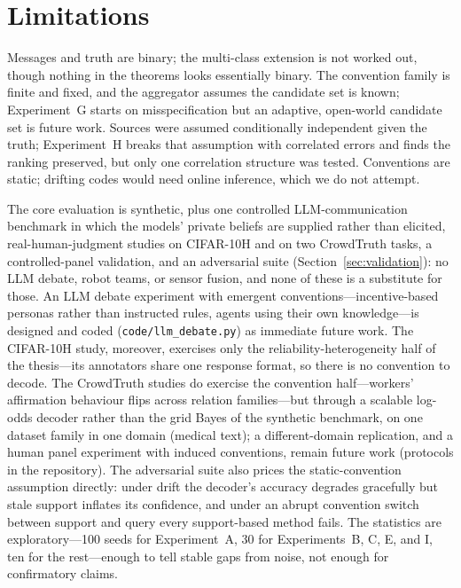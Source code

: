 \section{Limitations}

Messages and truth are binary; the multi-class extension is not worked
out, though nothing in the theorems looks essentially binary. The
convention family is finite and fixed, and the aggregator assumes the
candidate set is known; Experiment~G starts on misspecification but an
adaptive, open-world candidate set is future work. Sources were assumed
conditionally independent given the truth; Experiment~H breaks that
assumption with correlated errors and finds the ranking preserved, but
only one correlation structure was tested. Conventions are static;
drifting codes would need online inference, which we do not attempt.

The core evaluation is synthetic, plus one controlled
LLM-communication benchmark in which the models' private beliefs are
supplied rather than elicited, real-human-judgment studies on
CIFAR-10H and on two CrowdTruth tasks, a controlled-panel
validation, and an adversarial suite (Section~\ref{sec:validation}):
no LLM debate, robot teams,
or sensor fusion, and none of these is a substitute for those. An LLM
debate experiment with emergent conventions---incentive-based personas
rather than instructed rules, agents using their own knowl\-edge---is
designed and coded (\texttt{code/llm\_debate.py}) as immediate future
work. The CIFAR-10H study, moreover, exercises only the
reliability-heterogeneity half of the thesis---its annotators share one
response format, so there is no convention to decode. The CrowdTruth
studies do exercise the convention half---workers' affirmation
behaviour flips across relation families---but through a scalable
log-odds decoder rather than the grid Bayes of the synthetic
benchmark, on one dataset family in one domain (medical text); a
different-domain replication, and a human panel experiment with
induced conventions, remain future work (protocols in the
repository). The adversarial suite also prices the static-convention
assumption directly: under drift the decoder's accuracy degrades
gracefully but stale support inflates its confidence, and under an
abrupt convention switch between support and query every
support-based method fails. The statistics are
exploratory---100 seeds for Experiment~A, 30 for Experiments~B, C, E,
and I, ten for the rest---enough to tell stable gaps from noise, not
enough for confirmatory claims.


